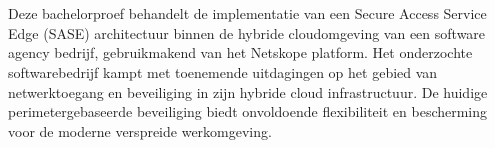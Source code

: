 
%
%
%
%
%

%



\chapter*{}

Deze bachelorproef behandelt de implementatie van een Secure Access Service Edge (SASE) architectuur binnen de hybride cloudomgeving van een software agency bedrijf, gebruikmakend van het Netskope platform. Het onderzochte softwarebedrijf kampt met toenemende uitdagingen op het gebied van netwerktoegang en beveiliging in zijn hybride cloud infrastructuur. De huidige perimetergebaseerde beveiliging biedt onvoldoende flexibiliteit en bescherming voor de moderne verspreide werkomgeving.

